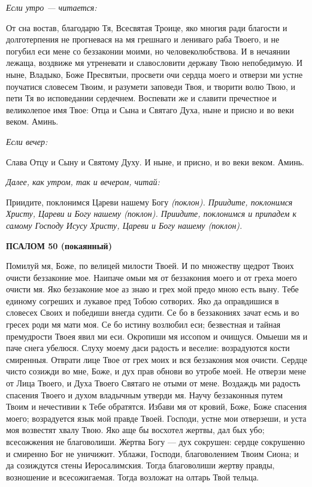 \medskip


\itshape Если утро — читается: \normalfont{}


От сна востав, благодарю Тя, Всесвятая Троице, яко многия ради благости и долготерпения не прогневася на мя грешнаго и лениваго раба Твоего, и не погубил еси мене со беззаконии моими, но человеколюбствова. И в нечаянии лежаща, воздвиже мя утреневати и славословити державу Твою непобедимую. И ныне, Владыко, Боже Пресвятыи, просвети очи сердца моего и отверзи ми устне поучатися словесем Твоим, и разумети заповеди Твоя, и творити волю Твою, и пети Тя во исповедании сердечнем. Воспевати же и славити пречестное и великолепое имя Твое: Отца и Сына и Святаго Духа, ныне и присно и во веки веком. Аминь.


\medskip


\itshape Если вечер:\normalfont{}


Слава Отцу и Сыну и Святому Духу. И ныне, и присно, и во веки веком. Аминь.


\medskip


\itshape Далее, как утром, так и вечером, читай:\normalfont{}


Приидите, поклонимся Цареви нашему Богу \itshape (поклон)\normalfont{}. Приидите, поклонимся Христу, Цареви и Богу нашему \itshape (поклон)\normalfont{}. Приидите, поклонимся и припадем к самому Господу Исусу Христу, Цареви и Богу нашему \itshape (поклон)\normalfont{}. 


\medskip


\bfseries ПСАЛОМ 50 (покаянный)\normalfont{}


Помилуй мя, Боже, по велицей милости Твоей. И по множеству щедрот Твоих очисти беззаконие мое. Наипаче омыи мя от беззакония моего и от греха моего очисти мя. Яко беззаконие мое аз знаю и грех мой предо мною есть выну. Тебе единому согреших и лукавое пред Тобою сотворих. Яко да оправдишися в словесех Своих и победиши внегда судити. Се бо в беззакониях зачат есмь и во гресех роди мя мати моя. Се бо истину возлюбил еси; безвестная и тайная премудрости Твоея явил ми еси. Окропиши мя иссопом и очищуся. Омыеши мя и паче снега убелюся. Слуху моему даси радость и веселие: возрадуются кости смиренныя. Отврати лице Твое от грех моих и вся беззакония моя очисти. Сердце чисто созижди во мне, Боже, и дух прав обнови во утробе моей. Не отверзи мене от Лица Твоего, и Духа Твоего Святаго не отыми от мене. Воздаждь ми радость спасения Твоего и духом владычным утверди мя. Научу беззаконныя путем Твоим и нечестивии к Тебе обратятся. Избави мя от кровий, Боже, Боже спасения моего; возрадуется язык мой правде Твоей. Господи, устне мои отверзеши, и уста моя возвестят хвалу Твою. Яко аще бы восхотел жертвы, дал бых убо; всесожжения не благоволиши. Жертва Богу — дух сокрушен: сердце сокрушенно и смиренно Бог не уничижит. Ублажи, Господи, благоволением Твоим Сиона; и да созиждутся стены Иеросалимския. Тогда благоволиши жертву правды, возношение и всесожигаемая. Тогда возложат на олтарь Твой тельца. 


